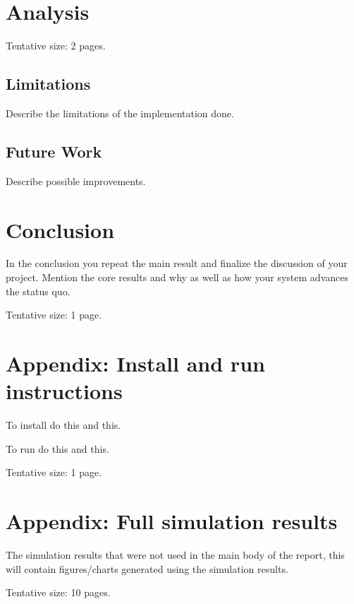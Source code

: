 \documentclass[a4paper,11pt,oneside]{report}
\begin{document}
\chapter{Analysis}

Tentative size: 2 pages.

\section{Limitations}
Describe the limitations of the implementation done.

\section{Future Work}
Describe possible improvements.

\chapter{Conclusion}

In the conclusion you repeat the main result and finalize the discussion of
your project. Mention the core results and why as well as how your system
advances the status quo.

Tentative size: 1 page.

\cleardoublepage
{}
{}
\printbibliography

\appendix
\chapter{Appendix: Install and run instructions}

To install do this and this.

To run do this and this.

Tentative size: 1 page.

\chapter{Appendix: Full simulation results}

The simulation results that were not used in the main body of the report, this
will contain figures/charts generated using the simulation results.

Tentative size: 10 pages.



\end{document}
